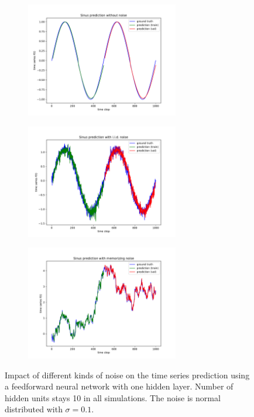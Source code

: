 \documentclass{article}
\begin{document}
\begin{figure}
  \centering
  \begin{subfigure}{\textwidth}
    \centering
    \includegraphics[height=5cm]{figures/plot_twolayer_noiseless.pdf}
  \end{subfigure}
  \begin{subfigure}{\textwidth}
    \centering
    \includegraphics[height=5cm]{figures/plot_twolayer_iidnoise.pdf}
  \end{subfigure}
  \begin{subfigure}{\textwidth}
    \centering
    \includegraphics[height=5cm]{figures/plot_twolayer_memnoise.pdf}
  \end{subfigure}
  \caption{Impact of different kinds of noise on the time series prediction
    using a feedforward neural network with one hidden layer. Number of hidden
    units stays 10 in all simulations. The noise is normal distributed with $\sigma =
      0.1$.}
  \label{fig:noise_impact}
\end{figure}
\end{document}
